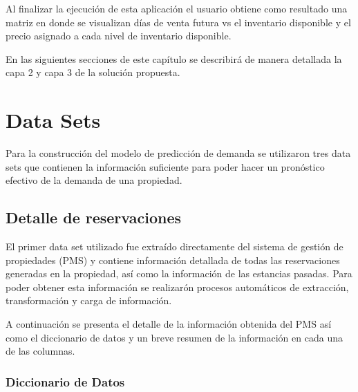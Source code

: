 Al finalizar la ejecución de esta aplicación el usuario obtiene como resultado una matriz en donde se visualizan días de venta futura vs el inventario disponible y el precio asignado a cada nivel de inventario disponible. 

En las siguientes secciones de este capítulo se describirá de manera detallada la capa 2 y capa 3 de la solución propuesta.

\section*{Data Sets}
Para la construcción del modelo de predicción de demanda se utilizaron tres data sets que contienen la información suficiente para poder hacer un pronóstico efectivo de la demanda de una propiedad.

\subsection*{Detalle de reservaciones}


El primer data set utilizado fue extraído directamente del sistema de gestión de propiedades (PMS) y contiene información detallada de todas las reservaciones generadas en la propiedad, así como la información de las estancias pasadas. Para poder obtener esta información se realizarón procesos automáticos de extracción, transformación y carga de información. 

A continuación se presenta el detalle de la información obtenida del PMS así como el diccionario de datos y un breve resumen de la información en cada una de las columnas.

\subsubsection*{Diccionario de Datos}


